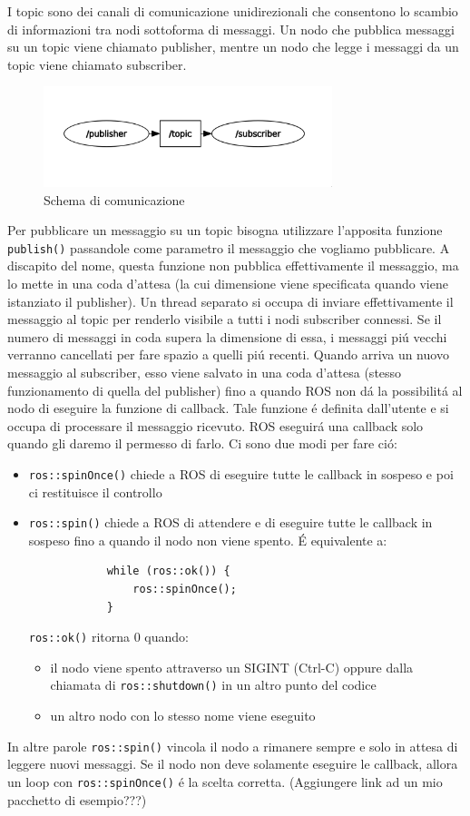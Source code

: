 I topic sono dei canali di comunicazione unidirezionali che consentono lo scambio di informazioni tra nodi sottoforma di 
messaggi. Un nodo che pubblica messaggi su un topic viene chiamato publisher, mentre un nodo che legge i messaggi da un topic 
viene chiamato subscriber.
\begin{figure}[H]
    \centering
    \includegraphics*[width=0.75\textwidth]{images/topic_graph.png}
    \caption{Schema di comunicazione}
    \label{fig:topic_graph}
\end{figure}
Per pubblicare un messaggio su un topic bisogna utilizzare l'apposita funzione \verb|publish()| passandole come parametro 
il messaggio che vogliamo pubblicare.
A discapito del nome, questa funzione non pubblica effettivamente il messaggio, ma lo mette in una coda d'attesa (la cui 
dimensione viene specificata quando viene istanziato il publisher).
Un thread separato si occupa di inviare effettivamente il messaggio al topic per renderlo visibile a tutti i nodi subscriber 
connessi.
Se il numero di messaggi in coda supera la dimensione di essa, i messaggi pi\'{u} vecchi verranno cancellati per fare spazio 
a quelli pi\'{u} recenti. Quando arriva un nuovo messaggio al subscriber, esso viene salvato 
in una coda d'attesa (stesso funzionamento di quella del publisher) fino a quando ROS non d\'{a} la possibilit\'{a} al nodo 
di eseguire la funzione di callback. Tale funzione \'{e} definita dall'utente e si occupa di processare il messaggio ricevuto. 
ROS eseguir\'{a} una callback solo quando gli daremo il permesso di farlo. Ci sono due modi per fare ci\'{o}:
\begin{itemize}
    \item \verb|ros::spinOnce()| chiede a ROS di eseguire tutte le callback in sospeso e poi ci restituisce il controllo
    \item \verb|ros::spin()| chiede a ROS di attendere e di eseguire tutte le callback in sospeso fino a quando il nodo non 
          viene spento. \'{E} equivalente a:
          \begin{verbatim}
            while (ros::ok()) {
                ros::spinOnce();
            }
          \end{verbatim} 
          \verb|ros::ok()| ritorna 0 quando: 
          \begin{itemize}
            \item il nodo viene spento attraverso un SIGINT (Ctrl-C) oppure dalla chiamata di \verb|ros::shutdown()| in 
                  un altro punto del codice
            \item un altro nodo con lo stesso nome viene eseguito
          \end{itemize}
\end{itemize}
In altre parole \verb|ros::spin()| vincola il nodo a rimanere sempre e solo in attesa di leggere nuovi messaggi. 
Se il nodo non deve solamente eseguire le callback, allora un loop con \verb|ros::spinOnce()| \'{e} la scelta corretta.
(Aggiungere link ad un mio pacchetto di esempio???)
